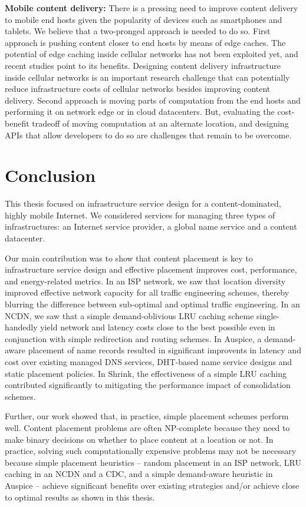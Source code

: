 {\textbf{Mobile content delivery:} There is a pressing need to improve content delivery to mobile end hosts given the popularity of devices such as smartphones and tablets. We believe that a two-pronged approach is needed to do so. First approach is pushing content closer to end hosts by means of edge caches. The potential of edge caching inside cellular networks has not been exploited yet, and recent studies point to its benefits. Designing content delivery infrastructure inside cellular networks is an important research challenge that can potentially reduce infrastructure costs of cellular networks besides improving content delivery. Second approach is moving parts of computation from the end hosts and performing it on network edge or in cloud datacenters. But, evaluating the cost-benefit tradeoff of moving computation at an alternate location, and designing APIs that allow developers to do so are challenges that remain to be overcome.
}

\chapter{Conclusion}

This thesis focused on infrastructure service design for  a content-dominated, highly mobile Internet. We considered services for managing three types of infrastructures: an Internet service provider, a global name service and a content datacenter.

Our main contribution was to show that content placement is key to infrastructure service design and effective placement improves cost, performance, and energy-related metrics. In an ISP network, we saw that location diversity improved effective network capacity for all traffic engineering schemes, thereby blurring the difference between sub-optimal and optimal traffic engineering. In an NCDN, we saw that a simple demand-oblivious LRU caching scheme single-handedly yield network and latency costs close to the best possible even in conjunction with simple redirection and routing schemes. In Auspice, a demand-aware placement of name records resulted in significant improvents in latency and cost over existing managed DNS services, DHT-based name service designs and static placement policies. In Shrink, the effectiveness of a simple LRU caching contributed significantly to mitigating the performance impact of consolidation schemes.

Further, our work showed that, in practice, simple placement schemes perform well. Content placement problems are often NP-complete because they need to make binary decisions on whether to place content at a location or not. In practice, solving such computationally expensive problems may not be necessary because simple placement heuristics -- random placement in an ISP network, LRU caching in an NCDN and a CDC, and a simple demand-aware heuristic in Auspice -- achieve significant benefits over existing strategies and/or achieve close to optimal results as shown in this thesis.

